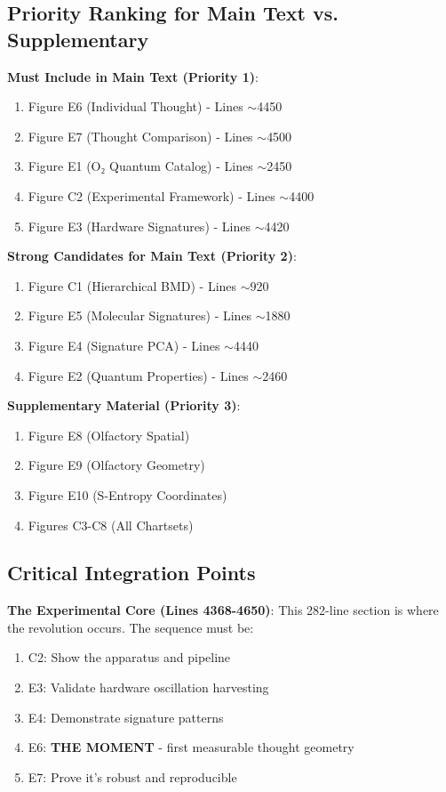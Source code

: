 \documentclass[11pt]{article}
\begin{document}
\subsection{Priority Ranking for Main Text vs. Supplementary}

\textbf{Must Include in Main Text (Priority 1)}:
\begin{enumerate}
\item Figure E6 (Individual Thought) - Lines $\sim$4450
\item Figure E7 (Thought Comparison) - Lines $\sim$4500
\item Figure E1 (O₂ Quantum Catalog) - Lines $\sim$2450
\item Figure C2 (Experimental Framework) - Lines $\sim$4400
\item Figure E3 (Hardware Signatures) - Lines $\sim$4420
\end{enumerate}

\textbf{Strong Candidates for Main Text (Priority 2)}:
\begin{enumerate}
\item Figure C1 (Hierarchical BMD) - Lines $\sim$920
\item Figure E5 (Molecular Signatures) - Lines $\sim$1880
\item Figure E4 (Signature PCA) - Lines $\sim$4440
\item Figure E2 (Quantum Properties) - Lines $\sim$2460
\end{enumerate}

\textbf{Supplementary Material (Priority 3)}:
\begin{enumerate}
\item Figure E8 (Olfactory Spatial)
\item Figure E9 (Olfactory Geometry)
\item Figure E10 (S-Entropy Coordinates)
\item Figures C3-C8 (All Chartsets)
\end{enumerate}

\subsection{Critical Integration Points}

\textbf{The Experimental Core (Lines 4368-4650)}:
This 282-line section is where the revolution occurs. The sequence must be:
\begin{enumerate}
\item C2: Show the apparatus and pipeline
\item E3: Validate hardware oscillation harvesting
\item E4: Demonstrate signature patterns
\item E6: \textbf{THE MOMENT} - first measurable thought geometry
\item E7: Prove it's robust and reproducible
\end{enumerate}
\end{document}
